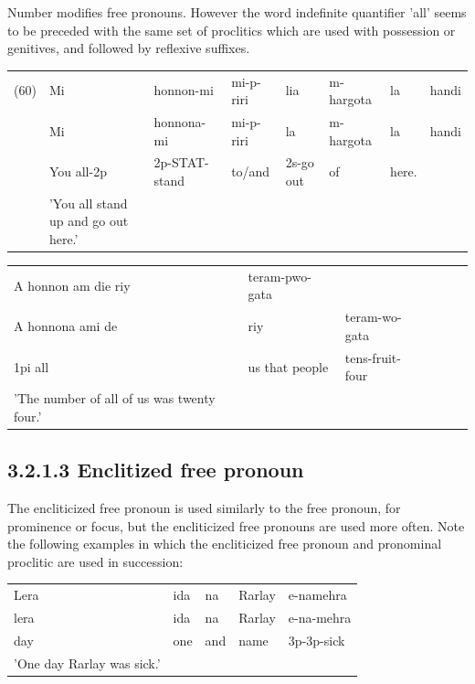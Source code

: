 \documentclass[10pt]{article}
\begin{document}
Number modifies free pronouns. However the word indefinite quantifier 'all' seems to be preceded with the same set of proclitics which are used with possession or genitives, and followed by reflexive suffixes.

\begin{center}
\begin{tabular}{llllllll}
(60) & Mi & honnon-mi & mi-p-riri & lia & m-hargota & la & handi \\
 & Mi & honnona-mi & mi-p-riri & la & m-hargota & la & handi \\
 & You all-2p & 2p-STAT-stand & to/and & 2s-go out & of & here. &  \\
 & 'You all stand up and go out here.' &  &  &  &  &  &  \\
\end{tabular}
\end{center}

\begin{center}
\begin{tabular}{llllll}
A honnon am die riy & teram-pwo-gata &  \\
A honnona ami de & riy & teram-wo-gata \\
1pi all & us that people & tens-fruit-four \\
'The number of all of us was twenty four.' &  &  \\
\end{tabular}
\end{center}

\subsection*{3.2.1.3 Enclitized free pronoun}
The encliticized free pronoun is used similarly to the free pronoun, for prominence or focus, but the encliticized free pronouns are used more often. Note the following examples in which the encliticized free pronoun and pronominal proclitic are used in succession:

\begin{center}
\begin{tabular}{lllll}
Lera & ida & na & Rarlay & e-namehra \\
lera & ida & na & Rarlay & e-na-mehra \\
day & one & and & name & 3p-3p-sick \\
'One day Rarlay was sick.' &  &  &  &  \\
\end{tabular}
\end{center}
\end{document}
